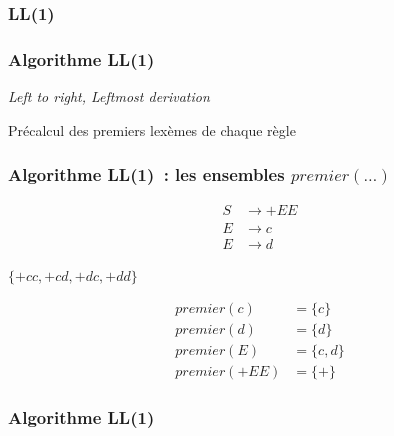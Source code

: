 %

\subsubsection{LL(1)}
\begin{frame}[fragile]
    \frametitle{Algorithme LL(1)}

    \textit{Left to right, Leftmost derivation}

    Précalcul des premiers lexèmes de chaque règle

\end{frame}

\begin{frame}[fragile]
    \frametitle{Algorithme LL(1)~: les ensembles $premier(\dots)$}

    \begin{align*}
        S & \to +EE \\
        E & \to c   \\
        E & \to d
    \end{align*}

    $\{+cc, +cd, +dc, +dd\}$
    \pause

    \begin{align*}
        premier(c)   & = \{c\}    \\
        premier(d)   & = \{d\}    \\
        premier(E)   & = \{c, d\} \\
        premier(+EE) & = \{+\}
    \end{align*}

\end{frame}

\begin{frame}[fragile]
    \frametitle{Algorithme LL(1)}

    \begin{algorithm}[H]
        \DontPrintSemicolon



        \caption{LL(1)}
    \end{algorithm}

\end{frame}

